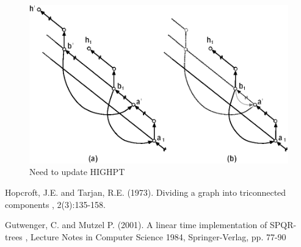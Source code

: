 \documentclass[twoside,twocolumn]{article}
\begin{document}
\begin{figure}[!htb]
\centering
\includegraphics[scale=0.7]{spqr_fig18.eps}
\caption{Need to update HIGHPT}
\label{fig:fig18}
\end{figure}



\begin{thebibliography}{99} %

Hopcroft, J.E. and Tarjan, R.E. (1973).
\newblock Dividing a graph into triconnected components
, 2(3):135-158.

Gutwenger, C. and Mutzel P. (2001).
\newblock A linear time implementation of SPQR-trees
, Lecture Notes in Computer Science 1984, Springer-Verlag, pp. 77-90
 
 

\end{thebibliography}

\end{document}
